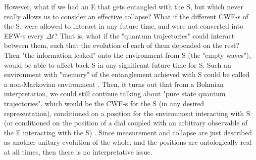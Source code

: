 \documentclass[11pt, a4paper]{article} %
\begin{document}

However, what if we had an E that gets entangled with the S, but which never really allows us to consider an effective collapse? What if the different CWF-s of the S, were allowed to interact in any future time, and were not converted into EFW-s every $\Delta t$? That is, what if the "quantum trajectories" could interact between them, such that the evolution of each of them depended on the rest? Then "the information leaked" onto the environment from S (the "empty waves"), would be able to affect back S in any significant future time for S. Such an environment with "memory" of the entanglement achieved with S could be called a non-Markovian environment \cite{MarkovianityDefs}. Then, it turns out that from a Bohmian interpretation, we could still continue talking about "pure state quantum trajectories", which would be the CWF-s for the S (in any desired representation), conditioned on a position for the environment interacting with S (or conditioned on the position of a dial coupled with an arbitrary observable of the E interacting with the S) \cite{NMisModal, interpretSSE}. Since measurement and collapse are just described as another unitary evolution of the whole, and the positions are ontologically real at all times, then there is no interpretative issue.
\end{document}
